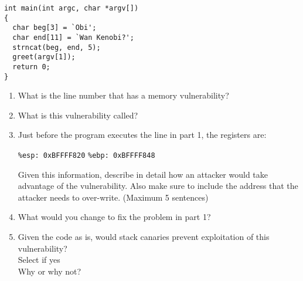 \documentclass[12pt]{exam}
\newcommand{\solbox}[2]{%
\fbox{%
\parbox[c][#1][t]{\dimexpr\linewidth-2\fboxsep-2\fboxrule}{
  \hrule width \hsize height 0pt
  #2
 }%
}%
\par\vspace{\ht\strutbox}
}
\newcommand{\textfield}[3]{%
\iftoggle{pdfform}{%
\TextField[name = #1, backgroundcolor=white, height=#2,
width = \linewidth, multiline=true]{\mbox}%
}{%
\ifprintanswers\else{%
    \solbox{#2}{#3}}
\fi%
}%
}
\newcommand{\includesolution}[1]{%
\IfFileExists{solutions/#1.tex}{%
\begin{solution}%
%
\end{solution}%
}{}
}
\newcommand{\checkbox}[3]{%
\ifprintanswers\else%
\CheckBox[name = #1, checked = #3, backgroundcolor=white, bordercolor=black, #2]{}%
\fi%
}
\begin{document}
\begin{Form}
\begin{questions}
\begin{lstlisting}
int main(int argc, char *argv[])
{
  char beg[3] = `Obi';
  char end[11] = `Wan Kenobi?';
  strncat(beg, end, 5);
  greet(argv[1]);
  return 0;
}
\end{lstlisting}

\begin{enumerate}
  \item What is the line number that has a memory vulnerability? \\
\textfield{Q4P1}{0.5cm}{
    5
}
  \item What is this vulnerability called?\\
\textfield{Q4P2}{0.5cm}{
    buffer overflow attack
}
  \item Just before the program executes the line in part 1, the registers are:
    \begin{center}
      \texttt{\%esp: 0xBFFFF820}
      \hspace{2cm}
      \texttt{\%ebp: 0xBFFFF848}
    \end{center}
    Given this information, describe in detail how an attacker would take advantage of the vulnerability.
    Also make sure to include the address that the attacker needs to over-write. (Maximum 5 sentences)\\
\textfield{Q4P3}{3cm}{
    The most simple exploit is code injection. The attacker should input more than 12 characters (I can't determine the exact number because of memory alignment issue) and overwrite the function return address area. The address that the attacker need to overwrite is 0xbffff820. By the way, the attacker can printf any stack data as he want.
}
  \item What would you change to fix the problem in part 1?\\
\textfield{Q4P4}{0.5cm}{
    Please use C++ std::getline rather than unsafe scanf. An example written by me is here: https://github.com/recolic/rlib/blob/3a442c6dd8661d45cfe7528112b93c42ffa5d591/stdio.hpp#L52
    
    If I must figure out the implementation of std::getline, please read here: https://github.com/recolic/rlib/blob/3a442c6dd8661d45cfe7528112b93c42ffa5d591/sys/sio.hpp#L516
}
  \item Given the code as is, would stack canaries prevent exploitation of this vulnerability?\\
      Select if yes \checkbox{Q4P5Y}{}{
      false}\\
    Why or why not?\\
\textfield{Q4P5}{1cm}{
    Stack canaries can make the exploit harder, but it won't prevent the exploitation. The attacker can still printf data on stack. However, canaries are still very very useful to protect this program. I considered for some time and answer "no".
}
\end{enumerate}
\includesolution{sol4}



\end{questions}
\end{Form}
\end{document}
